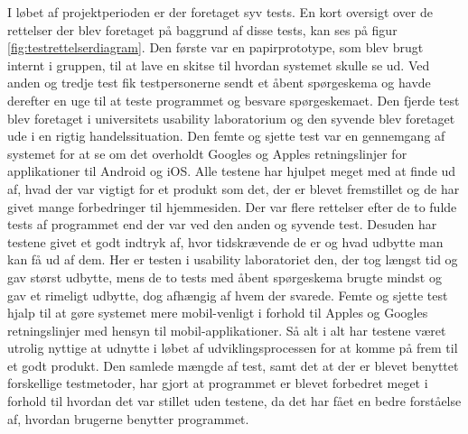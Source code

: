 I løbet af projektperioden er der foretaget syv tests. En kort oversigt over de rettelser der blev foretaget på baggrund af disse tests, kan ses på figur \ref{fig:testrettelserdiagram}. Den første var en papirprototype, som blev brugt internt i gruppen, til at lave en skitse til hvordan systemet skulle se ud. Ved anden og tredje test fik testpersonerne sendt et åbent spørgeskema og havde derefter en uge til at teste programmet og besvare spørgeskemaet. Den fjerde test blev foretaget i universitets usability laboratorium og den syvende blev foretaget ude i en rigtig handelssituation. Den femte og sjette test var en gennemgang af systemet for at se om det overholdt Googles og Apples retningslinjer for applikationer til Android og iOS. Alle testene har hjulpet meget med at finde ud af, hvad der var vigtigt for et produkt som det, der er blevet fremstillet og de har givet mange forbedringer til hjemmesiden. Der var flere rettelser efter de to fulde tests af programmet end der var ved den anden og syvende test. Desuden har testene givet et godt indtryk af, hvor tidskrævende de er og hvad udbytte man kan få ud af dem. Her er testen i usability laboratoriet den, der tog længst tid og gav størst udbytte, mens de to tests med åbent spørgeskema brugte mindst og gav et rimeligt udbytte, dog afhængig af hvem der svarede. Femte og sjette test hjalp til at gøre systemet mere mobil-venligt i forhold til Apples og Googles retningslinjer med hensyn til mobil-applikationer. Så alt i alt har testene været utrolig nyttige at udnytte i løbet af udviklingsprocessen for at komme på frem til et godt produkt. Den samlede mængde af test, samt det at der er blevet benyttet forskellige testmetoder, har gjort at programmet er blevet forbedret meget i forhold til hvordan det var stillet uden testene, da det har fået en bedre forståelse af, hvordan brugerne benytter programmet.
